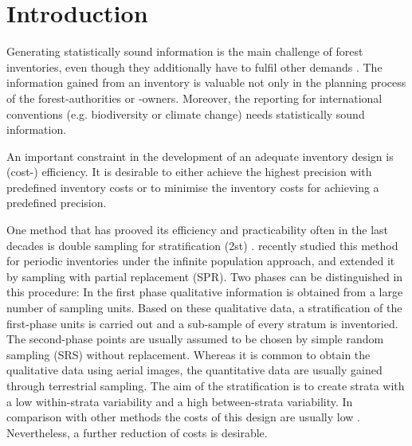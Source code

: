 
\section{Introduction}
\label{sec:introduction}
Generating statistically sound information is the main challenge of forest inventories, even though they additionally have to fulfil other demands \citep{Lund_1998}. The information gained from an inventory is valuable not only in the planning process of the forest-authorities or -owners. Moreover, the reporting for international conventions (e.g. biodiversity or climate change) needs statistically sound information. 

An important constraint in the development of an adequate inventory design is (cost-) efficiency. It is desirable to either achieve the highest precision with predefined inventory costs or to minimise the inventory costs for achieving a predefined precision.

One method that has prooved its efficiency and practicability often in the last decades is double sampling for stratification (2st) \citep{Cochran_1977, Vries_1986, Schreuder_1993, Koehl_1994, Saerndal_2003, Gregoire_2008, Mandallaz_2008}. \citet{Saborowski_2010} recently studied this method for periodic inventories under the infinite population approach, and \citet{Scott_1994} extended it by sampling with partial replacement (SPR). Two phases can be distinguished in this procedure: In the first phase qualitative information is obtained from a large number of sampling units. Based on these qualitative data, a stratification of the first-phase units is carried out and a sub-sample of every stratum is inventoried. The second-phase points are usually assumed to be chosen by simple random sampling (SRS) without replacement. Whereas it is common to obtain the qualitative data using aerial images, the quantitative data are usually gained through terrestrial sampling. The aim of the stratification is to create 
strata with a low 
within-strata 
variability and a high between-strata variability. In comparison with other methods the costs of this design are usually low \citep{Brassel_2001,Saborowski_2010}. Nevertheless, a further reduction of costs is desirable.

